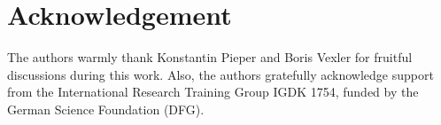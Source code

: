
\section*{Acknowledgement}
The authors warmly thank Konstantin Pieper and Boris Vexler for fruitful discussions during this work. Also, the authors gratefully acknowledge support from the International Research Training Group IGDK 1754, funded by the German Science Foundation (DFG).

